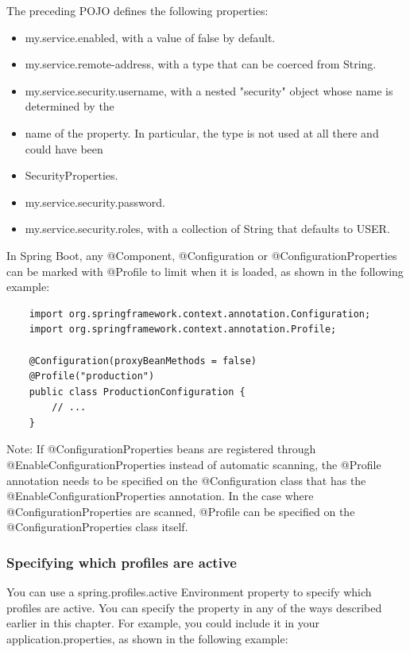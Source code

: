 \documentclass{scrartcl}
\begin{document}
The preceding POJO defines the following properties:

\begin{itemize}
    \item my.service.enabled, with a value of false by default.
    \item my.service.remote-address, with a type that can be coerced from String.
    \item my.service.security.username, with a nested "security" object whose name is determined by the
    \item name of the property. In particular, the type is not used at all there and could have been
    \item SecurityProperties.
    \item my.service.security.password.
    \item my.service.security.roles, with a collection of String that defaults to USER.
\end{itemize}

In Spring Boot, any @Component, @Configuration or @ConfigurationProperties can be marked with @Profile to limit when it is loaded, as shown in the following example:

\begin{lstlisting}
    import org.springframework.context.annotation.Configuration;
    import org.springframework.context.annotation.Profile;

    @Configuration(proxyBeanMethods = false)
    @Profile("production")
    public class ProductionConfiguration {
        // ...
    }
\end{lstlisting}

Note: If @ConfigurationProperties beans are registered through @EnableConfigurationProperties instead of automatic scanning, the @Profile annotation needs to be specified on the @Configuration class that has the @EnableConfigurationProperties annotation. In the case where @ConfigurationProperties are scanned, @Profile can be specified on the @ConfigurationProperties class itself.


\subsubsection{Specifying which profiles are active}

You can use a spring.profiles.active Environment property to specify which profiles are active. You can specify the property in any of the ways described earlier in this chapter. For example, you could include it in your application.properties, as shown in the following example:
\end{document}
